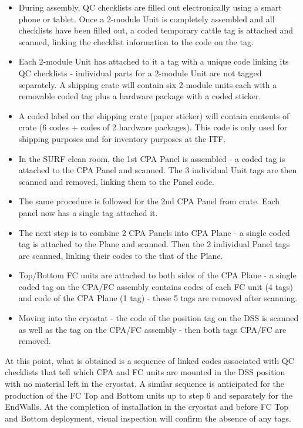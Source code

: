 \begin{itemize}
\item During assembly, QC checklists are filled out electronically using a smart phone or tablet.  Once a 2-module Unit is completely assembled and all checklists have been filled out, a coded temporary cattle tag is attached and scanned, linking the checklist information to the code on the tag.
\item Each 2-module Unit has attached to it a tag with a unique code linking its QC checklists - individual parts for a 2-module Unit are not tagged separately.   A shipping crate will contain six 2-module units each with a removable coded tag plus a hardware package with a coded sticker.
\item A coded label on the shipping crate (paper sticker) will contain contents of crate (6 codes + codes of 2 hardware packages).  This code is only used for shipping purposes and for inventory purposes at the ITF.
\item In the SURF clean room, the 1st CPA Panel is assembled - a coded tag is attached to the CPA Panel and scanned.  The 3 individual Unit tags are then scanned and removed, linking them to the Panel code.
\item The same procedure is followed for the 2nd CPA Panel from crate.  Each panel now has a single tag attached it.
\item The next step is to combine 2 CPA Panels into CPA Plane - a single coded tag is attached to the Plane and scanned.  Then the 2 individual Panel tags are scanned, linking their codes to the that of the Plane.
\item Top/Bottom FC units are attached to both sides of the CPA Plane - a single coded tag on the CPA/FC assembly contains codes of each FC unit (4 tags) and code of the CPA Plane (1 tag) - these 5 tags are removed after scanning.  
\item Moving into the cryostat - the code of the position tag on the DSS is scanned as well as the tag on the CPA/FC assembly - then both tags CPA/FC are removed.
\end{itemize}
At this point, what is obtained is a sequence of linked codes associated with QC checklists that tell which CPA and FC units are mounted in the DSS position with no material left in the cryostat.  A similar sequence is anticipated for the production of the FC Top and Bottom units up to step 6 and separately for the EndWalls.  At the completion of installation in the cryostat and before FC Top and Bottom deployment, visual inspection will confirm the absence of any tags.

